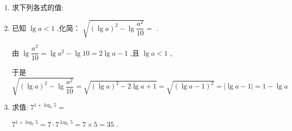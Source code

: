 \begin{enumerate}
\begin{jieda}
    \end{jieda}
    \item 求下列各式的值:
    \begin{jieda}
    \end{jieda}
    \item 已知 $\lg a < 1$ ,化简： $\sqrt{{\left( \lg a\right) }^{2} - \lg \dfrac{{a}^{2}}{10}} = $ .
    \begin{jieda}
        由 $\lg \dfrac{{a}^{2}}{10} = \lg {a}^{2} - \lg {10} = 2\lg a - 1$ ,且 $\lg a < 1$ ,
        
        于是 $\sqrt{{\left( \lg a\right) }^{2} - \lg \dfrac{{a}^{2}}{10}} = \sqrt{{\left( \lg a\right) }^{2} - 2\lg a + 1} = \sqrt{{\left( \lg a - 1\right) }^{2}} = \left| {\lg a - 1}\right|  = 1 - \lg a$
    \end{jieda}
    \item 求值: ${7}^{1 + {\log }_{7}5} = $
    \begin{jieda}
        ${7}^{1 + {\log }_{7}5} = 7 \cdot  {7}^{{\log }_{7}5} = 7 \times  5 = {35}$ .
    \end{jieda}
    

\end{enumerate}
